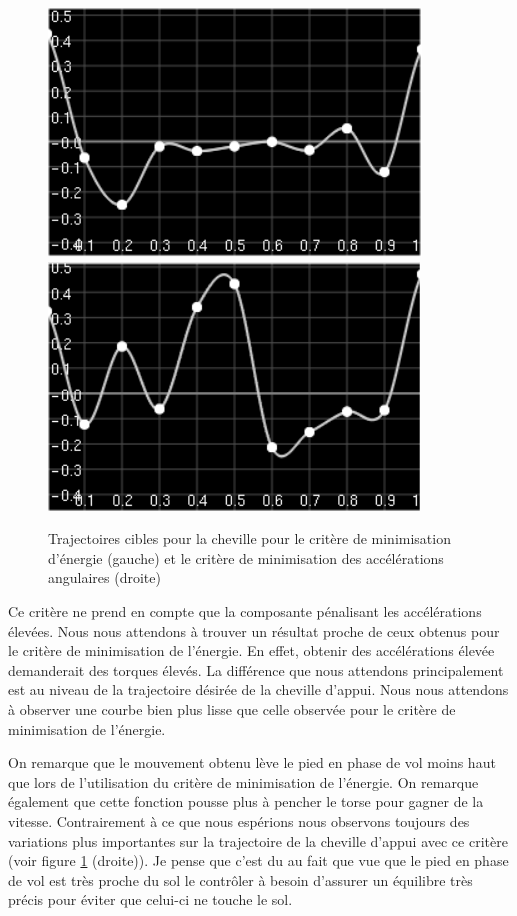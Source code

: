 \documentclass[runningheads,a4paper]{llncs}
\begin{document}
\begin{figure}[h]
\centering
\includegraphics[scale=0.5]{strips/stance_ankle_min_torque.png}
\includegraphics[scale=0.5]{strips/stance_ankle_min_acc.png}
\caption{Trajectoires cibles pour la cheville pour le critère de minimisation d'énergie (gauche) et le critère de minimisation des accélérations angulaires (droite)}
\label{fig:traj_ankle_min_torque}
\label{fig:traj_ankle_min_acc}
\end{figure}
Ce critère ne prend en compte que la composante pénalisant les accélérations élevées. Nous nous attendons à trouver un résultat proche de ceux obtenus pour le critère de minimisation de l'énergie. En effet, obtenir des accélérations élevée demanderait des torques élevés. La différence que nous attendons principalement est au niveau de la trajectoire désirée de la cheville d'appui. Nous nous attendons à observer une courbe bien plus lisse que celle observée pour le critère de minimisation de l'énergie.

On remarque que le mouvement obtenu lève le pied en phase de vol moins haut que lors de l'utilisation du critère de minimisation de l'énergie. On remarque également que cette fonction pousse plus à pencher le torse pour gagner de la vitesse.
 Contrairement à ce que nous espérions nous observons toujours des variations plus importantes sur la trajectoire de la cheville d'appui avec ce critère (voir figure \ref{fig:traj_ankle_min_acc} (droite)). Je pense que c'est du au fait que vue que le pied en phase de vol est très proche du sol le contrôler à besoin d'assurer un équilibre très précis pour éviter que celui-ci ne touche le sol.
\end{document}
